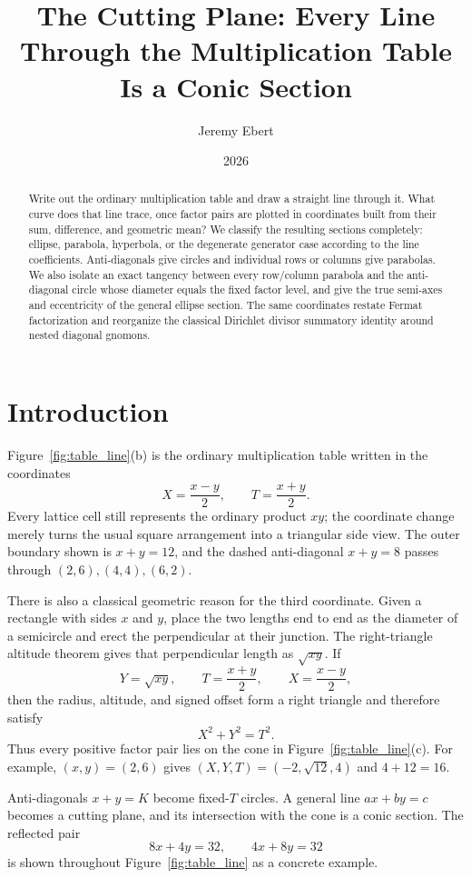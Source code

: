 \documentclass[11pt]{amsart}
\title{The Cutting Plane: Every Line Through the Multiplication Table Is a Conic Section}
\author{Jeremy Ebert}
\date{2026}
\theoremstyle{remark}
\begin{document}
\maketitle

\begin{abstract}
Write out the ordinary multiplication table and draw a straight line through it. What curve does that line trace, once factor pairs are plotted in coordinates built from their sum, difference, and geometric mean? We classify the resulting sections completely: ellipse, parabola, hyperbola, or the degenerate generator case according to the line coefficients. Anti-diagonals give circles and individual rows or columns give parabolas. We also isolate an exact tangency between every row/column parabola and the anti-diagonal circle whose diameter equals the fixed factor level, and give the true semi-axes and eccentricity of the general ellipse section. The same coordinates restate Fermat factorization and reorganize the classical Dirichlet divisor summatory identity around nested diagonal gnomons.
\end{abstract}

\section{Introduction}
Figure~\ref{fig:table_line}(b) is the ordinary multiplication table written in the coordinates
\[
X=\frac{x-y}{2},\qquad T=\frac{x+y}{2}.
\]
Every lattice cell still represents the ordinary product $xy$; the coordinate change merely turns the usual square arrangement into a triangular side view. The outer boundary shown is $x+y=12$, and the dashed anti-diagonal $x+y=8$ passes through $(2,6),(4,4),(6,2)$.

There is also a classical geometric reason for the third coordinate. Given a rectangle with sides $x$ and $y$, place the two lengths end to end as the diameter of a semicircle and erect the perpendicular at their junction. The right-triangle altitude theorem gives that perpendicular length as $\sqrt{xy}$. If
\[
Y=\sqrt{xy},\qquad T=\frac{x+y}{2},\qquad X=\frac{x-y}{2},
\]
then the radius, altitude, and signed offset form a right triangle and therefore satisfy
\[
X^2+Y^2=T^2.
\]
Thus every positive factor pair lies on the cone in Figure~\ref{fig:table_line}(c). For example, $(x,y)=(2,6)$ gives $(X,Y,T)=(-2,\sqrt{12},4)$ and $4+12=16$.

Anti-diagonals $x+y=K$ become fixed-$T$ circles. A general line $ax+by=c$ becomes a cutting plane, and its intersection with the cone is a conic section. The reflected pair
\[
8x+4y=32,\qquad 4x+8y=32
\]
is shown throughout Figure~\ref{fig:table_line} as a concrete example.
\end{document}
